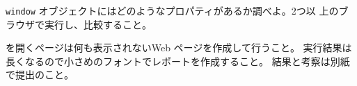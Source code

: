 \begin{Prob}\upshape
\Verb+window+ オブジェクトにはどのようなプロパティがあるか調べよ。2つ以
 上のブラウザで実行し、比較すること。
\end{Prob}
\ifText
{}を開くページは何も表示されないWeb ページを作成して行うこと。
実行結果は長くなるので小さめのフォントでレポートを作成すること。
結果と考察は別紙で提出のこと。
\fi